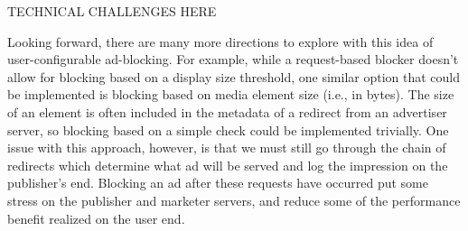 TECHNICAL CHALLENGES HERE

Looking forward, there are many more directions to explore with this idea of user-configurable ad-blocking.
For example, while a request-based blocker doesn't allow for blocking based on a display size threshold, one similar option that could be implemented is blocking based on media element size (i.e., in bytes).
The size of an element is often included in the metadata of a redirect from an advertiser server, so blocking based on a simple check could be implemented trivially.
One issue with this approach, however, is that we must still go through the chain of redirects which determine what ad will be served and log the impression on the publisher's end.
Blocking an ad after these requests have occurred put some stress on the publisher and marketer servers, and reduce some of the performance benefit realized on the user end.
